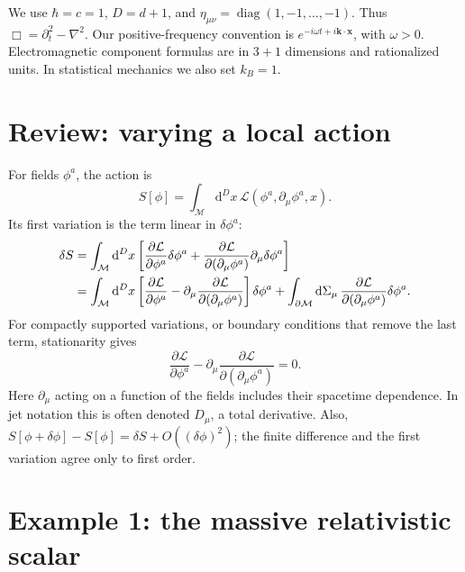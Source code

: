 \documentclass[11pt]{article}
\newcommand{\dd}{\mathrm{d}}
\newcommand{\Lag}{\mathcal{L}}
\newcommand{\cM}{\mathcal{M}}
\begin{document}
\begin{keyidea}[Conventions]
We use \(\hbar=c=1\), \(D=d+1\), and
\(\eta_{\mu\nu}=\operatorname{diag}(1,-1,\ldots,-1)\). Thus
\(\Box=\partial_t^2-\nabla^2\). Our positive-frequency convention is
\(e^{-i\omega t+i\bm k\cdot\bm x}\), with \(\omega>0\).
Electromagnetic component formulas are in \(3+1\) dimensions and rationalized
units. In statistical mechanics we also set \(k_B=1\).
\end{keyidea}

\section{Review: varying a local action}

For fields \(\phi^a\), the action is
\begin{equation}
S[\phi]=\int_\cM\dd^D x\,\Lag(\phi^a,\partial_\mu\phi^a,x).
\end{equation}
Its first variation is the term linear in \(\delta\phi^a\):
\begin{align}
\delta S
&=\int_\cM\dd^D x\left[
\frac{\partial\Lag}{\partial\phi^a}\delta\phi^a+
\frac{\partial\Lag}{\partial(\partial_\mu\phi^a)}
\partial_\mu\delta\phi^a\right]\notag\\
&=\int_\cM\dd^D x\left[
\frac{\partial\Lag}{\partial\phi^a}-
\partial_\mu\frac{\partial\Lag}{\partial(\partial_\mu\phi^a)}
\right]\delta\phi^a
+\int_{\partial\cM}\dd\Sigma_\mu\,
\frac{\partial\Lag}{\partial(\partial_\mu\phi^a)}\delta\phi^a.
\label{eq:variation}
\end{align}
For compactly supported variations, or boundary conditions that remove the
last term, stationarity gives
\begin{equation}
\boxed{\frac{\partial\Lag}{\partial\phi^a}-
\partial_\mu\frac{\partial\Lag}{\partial(\partial_\mu\phi^a)}=0.}
\label{eq:EL}
\end{equation}
Here \(\partial_\mu\) acting on a function of the fields includes their
spacetime dependence. In jet notation this is often denoted \(D_\mu\), a
total derivative. Also,
\(S[\phi+\delta\phi]-S[\phi]=\delta S+O((\delta\phi)^2)\);
the finite difference and the first variation agree only to first order.

\section{Example 1: the massive relativistic scalar}
\end{document}
